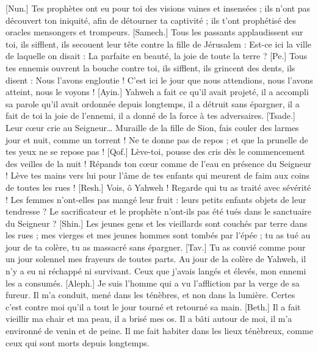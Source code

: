 \begin{multicols}{2}
[Nun.] Tes prophètes ont eu pour toi des visions vaines et insensées ; ils n'ont pas découvert ton iniquité, afin de détourner ta captivité ; ils t'ont prophétisé des oracles mensongers et trompeurs.
[Samech.] Tous les passants applaudissent sur toi, ils sifflent, ils secouent leur tête contre la fille de Jérusalem : Est-ce ici la ville de laquelle on disait : La parfaite en beauté, la joie de toute la terre ?
[Pe.] Tous tes ennemis ouvrent la bouche contre toi, ils sifflent, ils grincent des dents, ils disent : Nous l'avons engloutie ! C'est ici le jour que nous attendions, nous l'avons atteint, nous le voyons !
[Ayin.] Yahweh a fait ce qu'il avait projeté, il a accompli sa parole qu'il avait ordonnée depuis longtemps, il a détruit sans épargner, il a fait de toi la joie de l'ennemi, il a donné de la force à tes adversaires.
[Tsade.] Leur cœur crie au Seigneur… Muraille de la fille de Sion, fais couler des larmes jour et nuit, comme un torrent ! Ne te donne pas de repos ; et que la prunelle de tes yeux ne se repose pas !
[Qof.] Lève-toi, pousse des cris dès le commencement des veilles de la nuit ! Répands ton cœur comme de l'eau en présence du Seigneur ! Lève tes mains vers lui pour l'âme de tes enfants qui meurent de faim aux coins de toutes les rues !
[Resh.] Vois, ô Yahweh ! Regarde qui tu as traité avec sévérité ! Les femmes n'ont-elles pas mangé leur fruit : leurs petits enfants objets de leur tendresse ? Le sacrificateur et le prophète n'ont-ils pas été tués dans le sanctuaire du Seigneur ?
[Shin.] Les jeunes gens et les vieillards sont couchés par terre dans les rues ; mes vierges et mes jeunes hommes sont tombés par l'épée ; tu as tué au jour de ta colère, tu as massacré sans épargner.
[Tav.] Tu as convié comme pour un jour solennel mes frayeurs de toutes parts. Au jour de la colère de Yahweh, il n'y a eu ni réchappé ni survivant. Ceux que j'avais langés et élevés, mon ennemi les a consumés.
\VerseOne{}[Aleph.] Je suis l'homme qui a vu l'affliction par la verge de sa fureur.
Il m'a conduit, mené dans les ténèbres, et non dans la lumière.
Certes c'est contre moi qu'il a tout le jour tourné et retourné sa main.
[Beth.] Il a fait vieillir ma chair et ma peau, il a brisé mes os.
Il a bâti autour de moi, il m'a environné de venin et de peine.
Il me fait habiter dans les lieux ténèbreux, comme ceux qui sont morts depuis longtemps.

\end{multicols}
